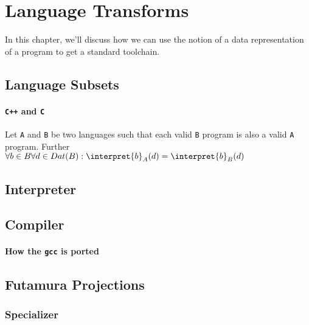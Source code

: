 \section{Language Transforms} %
\label{sec:transforms}
In this chapter, we'll discuss how we can use the notion of a data 
representation of a program to get a standard toolchain.
\subsection{Language Subsets} %
\label{sub:Language Subsets}
\paragraph{{\tt C++}  and {\tt C} } %
\label{par:Cpp and C}
\begin{defn}
	Let {\tt A} and {\tt B} be two languages such that each valid {\tt B} 
	program is also a valid {\tt A} program. Further 
	$\forall b\in B\forall d\in Dat(B): \interpret{b}_A(d) =
	\interpret{b}_B(d)$
\end{defn}

\subsection{Interpreter} %
\label{sub:Interpreter}

\subsection{Compiler} %
\label{sub:Compiler}
\paragraph{How the {\tt gcc} is ported} %
\label{par:gcc}

\subsection{Futamura Projections} %
\label{sub:Futamura}
\subsubsection{Specializer} %
\label{ssub:Specializer}
